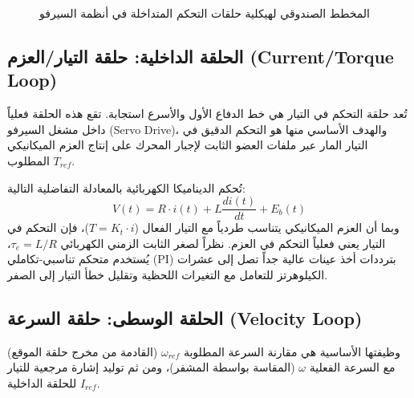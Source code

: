 \begin{figure}[h!]
{%
    }
    \caption[المخطط الصندوقي لهيكلية حلقات التحكم المتداخلة في أنظمة السيرفو]{\centering المخطط الصندوقي لهيكلية حلقات التحكم المتداخلة في أنظمة السيرفو}
    \label{fig:cascaded_loops}
\end{figure}

\subsection{الحلقة الداخلية: حلقة التيار/العزم (\textenglish{Current/Torque Loop})}
تُعد حلقة التحكم في التيار هي خط الدفاع الأول والأسرع استجابة. تقع هذه الحلقة فعلياً داخل مشغل السيرفو (\textenglish{Servo Drive})، والهدف الأساسي منها هو التحكم الدقيق في التيار المار عبر ملفات العضو الثابت لإجبار المحرك على إنتاج العزم الميكانيكي المطلوب $T_{ref}$.

تُحكم الديناميكا الكهربائية بالمعادلة التفاضلية التالية:
$$V(t) = R \cdot i(t) + L \frac{di(t)}{dt} + E_b(t)$$
وبما أن العزم الميكانيكي يتناسب طردياً مع التيار الفعال ($T = K_t \cdot i$)، فإن التحكم في التيار يعني فعلياً التحكم في العزم. نظراً لصغر الثابت الزمني الكهربائي $\tau_e = L/R$، يُستخدم متحكم تناسبي-تكاملي (\textenglish{PI}) بترددات أخذ عينات عالية جداً تصل إلى عشرات الكيلوهرتز للتعامل مع التغيرات اللحظية وتقليل خطأ التيار إلى الصفر.

\subsection{الحلقة الوسطى: حلقة السرعة (\textenglish{Velocity Loop})}
وظيفتها الأساسية هي مقارنة السرعة المطلوبة $\omega_{ref}$ (القادمة من مخرج حلقة الموقع) مع السرعة الفعلية $\omega$ (المقاسة بواسطة المشفر)، ومن ثم توليد إشارة مرجعية للتيار $I_{ref}$ للحلقة الداخلية.

